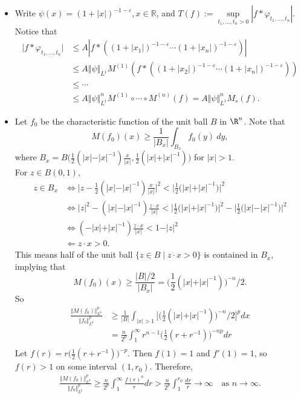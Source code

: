 \begin{itemize}
\item[2.1.7]
Write $\psi(x)=(1+\left\vert x \right\vert )^{-1-\varepsilon},x\in \mathbb{R}$, 
and $T(f):=\sup\limits_{t_1, \ldots ,t_n>0}\left\vert f*\varphi_{t_1, \ldots ,t_n} \right\vert $.\\
Notice that \begin{align}\vert f*\varphi_{t_1, \ldots ,t_n}\vert 
&\leq A\left\vert f*((1+\left\vert x_1 \right\vert )^{-1-\varepsilon}\cdots (1+\left\vert x_n \right\vert )^{-1-\varepsilon}) \right\vert \\
&\leq A\Vert \psi\Vert_{L^1}M^{(1)}(f*((1+\left\vert x_2 \right\vert )^{-1-\varepsilon}\cdots (1+\left\vert x_n \right\vert )^{-1-\varepsilon}))\\
&\leq \cdots\\
&\leq A\Vert \psi\Vert_{L^1}^nM^{(1)}\circ\cdots \circ M^{(n)}(f)
=A\Vert \psi\Vert_{L^1}^nM_s(f).\end{align}

\item[2.1.8]
Let $f_0$ be the characteristic function of the unit ball $B$ in $\R^n$. Note that
$$M(f_0)(x)\geq\frac1{|B_x|}\int_{B_x}f_0(y)\>dy,$$ 
where $B_x=B\big(\frac12(\vert x\vert-\vert x\vert^{-1})\frac{x}{\vert x\vert},
\frac12(\vert x\vert+\vert x\vert^{-1})\big)$ for $|x|>1$.\\
For $z\in B(0,1)$,
\begin{align*}
z\in B_x&\Leftrightarrow \textstyle{\big\vert z-\frac12(\vert x\vert-\vert x\vert^{-1})\frac{x}{\vert x\vert}\big\vert^2
<\big\vert\frac12\big(\vert x\vert+\vert x\vert^{-1}\big)\big\vert^2}\\
&\Leftrightarrow \textstyle{\vert z\vert^2-(\vert x\vert-\vert x\vert^{-1})\frac{z\cdot x}{\vert x\vert}
<\big\vert\frac12\big(\vert x\vert+\vert x\vert^{-1}\big)\big\vert^2-\big\vert\frac12\big(\vert x\vert-\vert x\vert^{-1}\big)\big\vert^2}\\
&\Leftrightarrow \textstyle{(-\vert x\vert+\vert x\vert^{-1})\frac{z\cdot x}{\vert x\vert}<1-\vert z \vert^2}\\
&\Leftarrow z\cdot x>0.
\end{align*}
This means half of the unit ball $\{z\in B\mid z\cdot x>0\}$ 
is contained in $B_x$, implying that
$$M(f_0)(x)\geq \frac{|B|/2}{\vert B_x\vert}=\big(\textstyle{\frac{1}{2}}(\vert x\vert+\vert x\vert^{-1})\big)^{-n}/2.$$
So 
\begin{align*}
\frac{\Vert M(f_0)\Vert_{L^p}^p}{\Vert f_0\Vert_{L^p}^p}
&\geq \frac{1}{|B|}\int_{\vert x\vert>1}\big[\big(\textstyle{\frac{1}{2}}(\vert x\vert+\vert x\vert^{-1})\big)^{-n}/2\big]^pdx\\
&=\frac{n}{2^p}\int_1^\infty r^{n-1}\big(\textstyle{\frac{1}{2}}(r+r^{-1})\big)^{-np}dr\\
\end{align*}
Let $f(r)=r\big(\textstyle{\frac{1}{2}}(r+r^{-1})\big)^{-p}$. 
Then $f(1)=1$ and $f'(1)=1$, so $f(r)>1$ on some interval $(1,r_0)$. Therefore,
\begin{align*}
\frac{\Vert M(f_0)\Vert_{L^p}^p}{\Vert f_0\Vert_{L^p}^p}
\geq \frac{n}{2^p}\int_1^\infty\frac{f(r)^n}rdr
>\frac{n}{2^p}\int_1^{r_0}\frac{dr}{r}\rightarrow \infty\quad\text{as }n\rightarrow \infty.
\end{align*}


\end{itemize}
